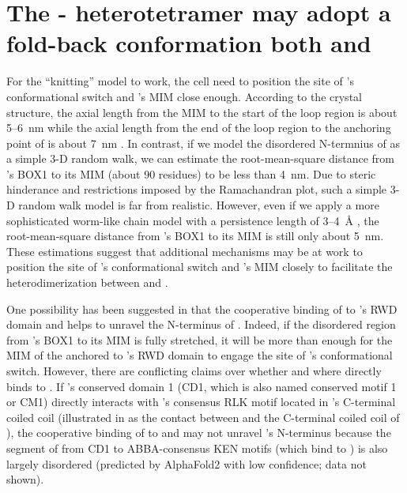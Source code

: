 \section{The - heterotetramer may adopt a fold-back conformation both  and }

For the ``knitting'' model to work, the cell need to position the site of 's conformational switch and 's MIM close enough. According to the crystal structure, the axial length from the MIM to the start of the loop region is about 5--\SI{6}{nm} while the axial length from the end of the loop region to the anchoring point of  is about \SI{7}{nm} \cite{TemplateModel, Ji2017eLife, BUB1-CDC20-MAD1, Structure1GO4, Structure4DZO}. In contrast, if we model the disordered N-termnius of  as a simple 3-D random walk, we can estimate the root-mean-square distance from 's BOX1 to its MIM (about 90 residues) to be less than \SI{4}{nm}. Due to steric hinderance and restrictions imposed by the Ramachandran plot, such a simple 3-D random walk model is far from realistic. However, even if we apply a more sophisticated worm-like chain model with a persistence length of 3--\SI{4}{\angstrom} \cite{RandomWalk3D-WormLikeChain}, the root-mean-square distance from 's BOX1 to its MIM is still only about \SI{5}{nm}. These estimations suggest that additional mechanisms may be at work to position the site of 's conformational switch and 's MIM closely to facilitate the heterodimerization between  and .

One possibility has been suggested in \cite{BUB1-CDC20-MAD1, Tripartite} that the cooperative binding of  to 's RWD domain and  helps to unravel the N-terminus of . Indeed, if the disordered region from 's BOX1 to its MIM is fully stretched, it will be more than enough for the MIM of the  anchored to 's RWD domain to engage the site of 's conformational switch. However, there are conflicting claims over whether and where  directly binds to  \cite{Ji2017eLife, BUB1-CDC20-MAD1, BUB1CD1-MAD1CStructure}. If 's conserved domain 1 (CD1, which is also named conserved motif 1 or CM1) directly interacts with 's consensus RLK motif located in 's C-terminal coiled coil \cite{Ji2017eLife, BUB1CD1-MAD1CStructure} (illustrated in  as the contact between  and the C-terminal coiled coil of ), the cooperative binding of  to  and  may not unravel 's N-terminus because the segment of  from CD1 to ABBA-consensus KEN motifs (which bind to  \cite{BUB1-CDC20-MAD1, CDC20-KEN, ABBA}) is also largely disordered (predicted by AlphaFold2 with low confidence; data not shown).

